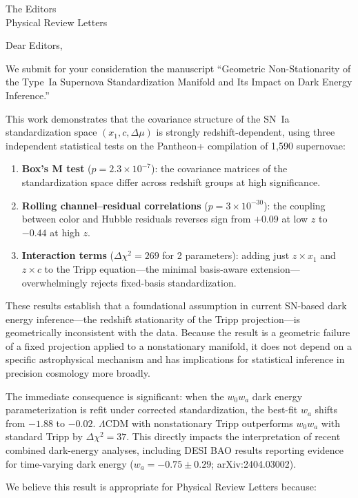 \documentclass[12pt]{letter}
\begin{document}
\begin{letter}{The Editors\\Physical Review Letters}

\opening{Dear Editors,}

We submit for your consideration the manuscript ``Geometric Non-Stationarity of the Type~Ia Supernova Standardization Manifold and Its Impact on Dark Energy Inference.''

This work demonstrates that the covariance structure of the SN~Ia standardization space $(x_1, c, \Delta\mu)$ is strongly redshift-dependent, using three independent statistical tests on the Pantheon+ compilation of 1,590 supernovae:

\begin{enumerate}
\item \textbf{Box's M test} ($p = 2.3 \times 10^{-7}$): the covariance matrices of the standardization space differ across redshift groups at high significance.
\item \textbf{Rolling channel--residual correlations} ($p = 3 \times 10^{-30}$): the coupling between color and Hubble residuals reverses sign from $+0.09$ at low $z$ to $-0.44$ at high $z$.
\item \textbf{Interaction terms} ($\Delta\chi^2 = 269$ for 2 parameters): adding just $z \times x_1$ and $z \times c$ to the Tripp equation---the minimal basis-aware extension---overwhelmingly rejects fixed-basis standardization.
\end{enumerate}

These results establish that a foundational assumption in current SN-based dark energy inference---the redshift stationarity of the Tripp projection---is geometrically inconsistent with the data. Because the result is a geometric failure of a fixed projection applied to a nonstationary manifold, it does not depend on a specific astrophysical mechanism and has implications for statistical inference in precision cosmology more broadly.

The immediate consequence is significant: when the $w_0 w_a$ dark energy parameterization is refit under corrected standardization, the best-fit $w_a$ shifts from $-1.88$ to $-0.02$. $\Lambda$CDM with nonstationary Tripp outperforms $w_0 w_a$ with standard Tripp by $\Delta\chi^2 = 37$. This directly impacts the interpretation of recent combined dark-energy analyses, including DESI BAO results reporting evidence for time-varying dark energy ($w_a = -0.75 \pm 0.29$; arXiv:2404.03002).

We believe this result is appropriate for Physical Review Letters because:


\end{letter}
\end{document}
